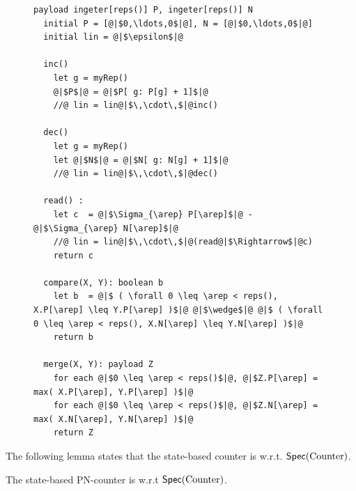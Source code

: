 \begin{figure}[t]
\begin{lstlisting}[frame=top,caption={Pseudo-code of state-based PN-counter},
captionpos=b,label={lst:state-based PN-counter}]
  payload ingeter[reps()] P, ingeter[reps()] N
  initial P = [@|$0,\ldots,0$|@], N = [@|$0,\ldots,0$|@]
  initial lin = @|$\epsilon$|@

  inc()
    let g = myRep()
    @|$P$|@ = @|$P[ g: P[g] + 1]$|@
    //@ lin = lin@|$\,\cdot\,$|@inc()

  dec()
    let g = myRep()
    let @|$N$|@ = @|$N[ g: N[g] + 1]$|@
    //@ lin = lin@|$\,\cdot\,$|@dec()

  read() :
    let c  = @|$\Sigma_{\arep} P[\arep]$|@ - @|$\Sigma_{\arep} N[\arep]$|@
    //@ lin = lin@|$\,\cdot\,$|@(read@|$\Rightarrow$|@c)
    return c

  compare(X, Y): boolean b
    let b  = @|$ ( \forall 0 \leq \arep < reps(), X.P[\arep] \leq Y.P[\arep] )$|@ @|$\wedge$|@ @|$ ( \forall 0 \leq \arep < reps(), X.N[\arep] \leq Y.N[\arep] )$|@
    return b

  merge(X, Y): payload Z
    for each @|$0 \leq \arep < reps()$|@, @|$Z.P[\arep] = max( X.P[\arep], Y.P[\arep] )$|@
    for each @|$0 \leq \arep < reps()$|@, @|$Z.N[\arep] = max( X.N[\arep], Y.N[\arep] )$|@
    return Z
\end{lstlisting}
\end{figure}

The following lemma states that the state-based counter is \crdtlinearizable{} w.r.t. $\mathsf{Spec}(\text{Counter})$.

\begin{lemma}
\label{lemma:state-based PN-counter is correct}
The state-based PN-counter is \crdtlinearizable{} w.r.t $\mathsf{Spec}(\text{Counter})$.
\end{lemma}


